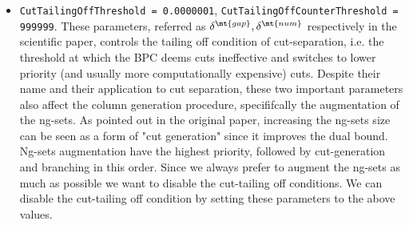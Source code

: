 \begin{itemize}
\begin{itemize}
		      \item \texttt{CutTailingOffThreshold = 0.0000001}, \texttt{CutTailingOffCounterThreshold = 999999}.
		            These parameters, referred as $\delta^\mt{gap}, \delta^\mt{num}$ respectively in the scientific paper,
		            controls the tailing off condition of cut-separation, i.e. the threshold
		            at which the BPC deems cuts ineffective and switches to lower priority
		            (and usually more computationally expensive) cuts.
		            Despite their name and their application to cut separation, these two important
		            parameters also affect the column generation procedure, specififcally the augmentation of the ng-sets.
		            As pointed out in the original paper,
		            increasing the ng-sets size can be seen as a form of "cut generation"
		            since it improves the dual bound.
		            Ng-sets augmentation have the highest priority, followed by cut-generation and branching in this order.
		            Since we always prefer to augment the ng-sets as much as possible we want
		            to disable the cut-tailing off conditions.
		            We can disable the cut-tailing off condition by setting these parameters to the above values.
	      \end{itemize}
\end{itemize}

\begin{comment}
[ About what is reduced cost fixing ]
[ Bucket arc elimination procedure = Reduced cost fixing procedure]
\textcite{sadykov2021}
VRPSolver extension includes an implementation of the pricing functor which
allows the user to define the subproblems as resource constrained shortest path
problems in graphs. The functor implements the bucket-graph based labeling
algorithm from paper [16] for solving the pricing problem, as well as the corre-
sponding bucket arc elimination procedure (i.e. reduced cost fixing procedure),
and the elementary route enumeration procedure [1]. VRPSolver extension also
implements cut separation functors for rounded cap
\end{comment}
